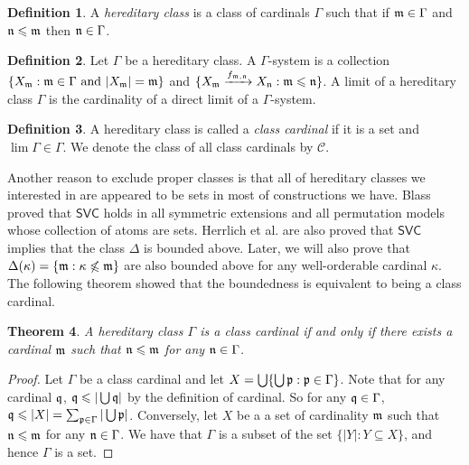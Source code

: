 \documentclass{amsart}
\newcommand{\SVC}{\ensuremath{\mathsf{SVC}}}
\newcommand{\CFin}{\mathscr{C}}
\DeclareMathOperator{\limm}{lim}
\renewcommand{\leq}{\leqslant}
\newcommand{\1}{\ensuremath{\mathds{1}}}
\theoremstyle{plain}
\newtheorem{thm}{Theorem}[section]
\theoremstyle{boldrk}
\theoremstyle{definition}
\newtheorem{defn}[thm]{Definition}
\begin{document}
\begin{defn}
A \emph{hereditary class} is a class of cardinals $\Gamma$ such that if $\frak{m}\in\Gamma$ and $\frak{n}\leq\frak{m}$ then $\frak{n}\in\Gamma$.
\end{defn}

\begin{defn}
Let $\Gamma$ be a hereditary class. A $\Gamma$-system is a collection $\{X_{\frak{m}}:\frak{m}\in\Gamma\text{ and }|X_{\frak{m}}|=\frak{m}\}$ and $\{X_{\frak{m}}\xrightarrow{f_{\frak{m},\frak{n}}} X_{\frak{n}}:\frak{m}\leq\frak{n}\}$. A limit of a hereditary class $\Gamma$ is the cardinality of a direct limit of a $\Gamma$-system.   
\end{defn}

\begin{defn}
     A hereditary class is called a \emph{class cardinal} if it is a set and $\limm\Gamma\in\Gamma$. We denote the class of all class cardinals by $\CFin$.
\end{defn}

Another reason to exclude proper classes is that all of hereditary classes we interested in are appeared to be sets in most of constructions we have. Blass proved that $\SVC$ holds in all symmetric extensions and all permutation models whose collection of atoms are sets. Herrlich et al. are also proved that $\SVC$ implies that the class $\Delta$ is bounded above. Later, we will also prove that $\Delta(\kappa)=\{\frak{m}:\kappa\not\leq\frak{m}\}$ are also bounded above for any well-orderable cardinal $\kappa$. The following theorem showed that the boundedness is equivalent to being a class cardinal. 



\begin{thm}
 A hereditary class $\Gamma$ is a class cardinal if and only if there exists a cardinal $\frak{m}$ such that $\frak{n}\leq\frak{m}$ for any $\frak{n}\in\Gamma$.   
\end{thm}

\begin{proof}
  Let $\Gamma$ be a class cardinal and let $X=\bigcup\{\bigcup\frak{p}:\frak{p}\in\Gamma\}$. Note that for any cardinal $\frak{q}$, $\frak{q}\leq |\bigcup\frak{q}|$ by the definition of cardinal. So for any $\frak{q}\in\Gamma$, $\frak{q}\leq |X|=\sum_{\frak{p}\in\Gamma}|\bigcup\frak{p}|$.  Conversely, let $X$ be a a set of cardinality $\frak{m}$ such that $\frak{n}\leq\frak{m}$ for any $\frak{n}\in\Gamma$. We have that $\Gamma$ is a subset of the set $\{|Y|:Y\subseteq X\}$, and hence $\Gamma$ is a set.  
\end{proof}
\end{document}
